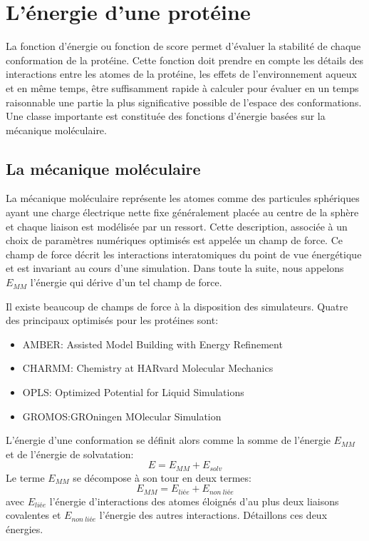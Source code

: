 \section{L'énergie d'une protéine}

La fonction d'énergie ou fonction de score permet d'évaluer la stabilité de chaque conformation de la protéine. Cette fonction doit prendre en compte les détails des interactions entre les atomes de la protéine, les effets de l'environnement aqueux et en même temps, être suffisamment rapide à calculer pour évaluer en un temps raisonnable une partie la plus significative possible de l'espace des conformations. Une classe importante est constituée des fonctions d'énergie basées sur la mécanique moléculaire.

\subsection{La mécanique moléculaire}
\label{sub:mecamol}
La mécanique moléculaire représente les atomes comme des particules sphériques ayant une charge électrique nette fixe généralement placée au centre de la sphère et chaque liaison est modélisée par un ressort. Cette description, associée à un choix de paramètres numériques optimisés est appelée un champ de force. Ce champ de force décrit les interactions interatomiques du point de vue énergétique et est invariant au cours d'une simulation.
Dans toute la suite, nous appelons $E_{MM}$ l'énergie qui dérive d'un tel champ de force.

Il existe beaucoup de champs de force à la disposition des simulateurs. Quatre des principaux optimisés pour les protéines sont:

\begin{itemize}
\item AMBER: Assisted Model Building with Energy Refinement \cite{Cornell95}
\item CHARMM: Chemistry at HARvard Molecular Mechanics \cite{Brooks09}
\item OPLS: Optimized Potential for Liquid Simulations \cite{Jorgensen88}
\item GROMOS:GROningen MOlecular Simulation \cite{Christen05}
\end{itemize}
L'énergie d'une conformation se définit alors comme la somme de l'énergie $E_{MM}$  et de l'énergie de solvatation:
\begin{equation}
  E = E_{MM} + E_{solv}
\end{equation}
Le terme $E_{MM}$ se décompose à son tour en deux termes:
\begin{equation}
  E_{MM} = E_{liée} + E_{non\ liée}
\end{equation}
avec $E_{liée}$ l'énergie d'interactions des atomes éloignés d'au plus deux liaisons covalentes et $E_{non\ liée}$  l'énergie des autres interactions. Détaillons ces deux énergies.

